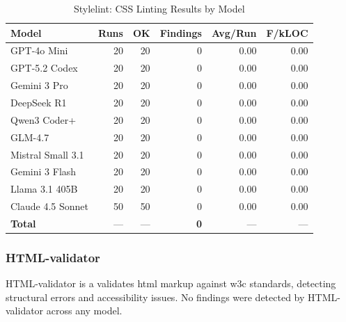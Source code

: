 \begin{table}[htbp]
    \centering
    \caption{Stylelint: CSS Linting Results by Model}
    \label{tab:tool_stylelint}
    \small
    \begin{tabular}{@{} l r r r r r @{}}
        \toprule
        \textbf{Model} & \textbf{Runs} & \textbf{OK} & \textbf{Findings} & \textbf{Avg/Run} & \textbf{F/kLOC} \\
        \midrule
        GPT-4o Mini & 20 & 20 & 0 & 0.00 & 0.00 \\
        GPT-5.2 Codex & 20 & 20 & 0 & 0.00 & 0.00 \\
        Gemini 3 Pro & 20 & 20 & 0 & 0.00 & 0.00 \\
        DeepSeek R1 & 20 & 20 & 0 & 0.00 & 0.00 \\
        Qwen3 Coder+ & 20 & 20 & 0 & 0.00 & 0.00 \\
        GLM-4.7 & 20 & 20 & 0 & 0.00 & 0.00 \\
        Mistral Small 3.1 & 20 & 20 & 0 & 0.00 & 0.00 \\
        Gemini 3 Flash & 20 & 20 & 0 & 0.00 & 0.00 \\
        Llama 3.1 405B & 20 & 20 & 0 & 0.00 & 0.00 \\
        Claude 4.5 Sonnet & 50 & 50 & 0 & 0.00 & 0.00 \\
        \midrule
        \textbf{Total} & --- & --- & \textbf{0} & --- & --- \\
        \bottomrule
    \end{tabular}
\end{table}

\subsubsection{HTML-validator}

HTML-validator is a validates html markup against w3c standards, detecting structural errors and accessibility issues.
 No findings were detected by HTML-validator across any model.

